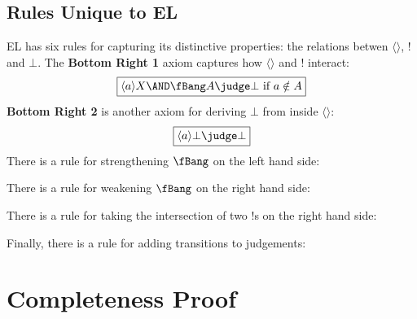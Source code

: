 \subsection{Rules Unique to EL}
EL has six rules for capturing its distinctive properties: the relations betwen $\langle \rangle$, $!$ and $\bot$.
The {\bf Bottom Right 1} axiom captures how $\langle \rangle$ and $!$ interact:
\[
\boxed
{
\langle a \rangle X \AND \fBang A \judge \bot \mbox{ if } a \notin A
}
\]
{\bf Bottom Right 2} is another axiom for deriving $\bot$ from inside $\langle \rangle$:
\[
\boxed
{
\langle a \rangle \bot \judge \bot
}
\]
There is a rule for strengthening $\fBang$ on the left hand side: 
\begin{center}
\end{center}
There is a rule for weakening $\fBang$ on the right hand side: 
\begin{center}
\end{center}
There is a rule for taking the intersection of two $!$s on the right hand side:
\begin{center}
\end{center}
Finally, there is a rule for adding transitions to judgements:
\begin{center}
\end{center}

\section{Completeness Proof}

